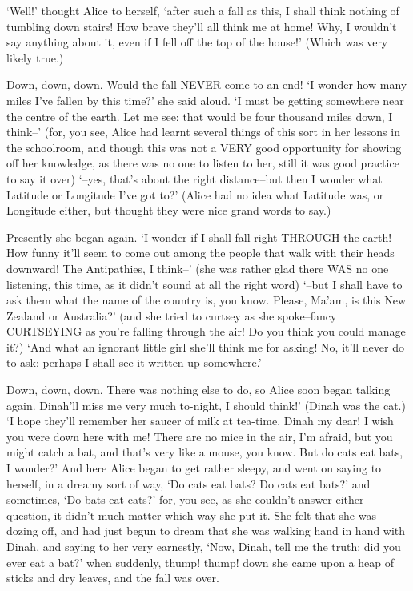 \documentclass{article}
\begin{document}
`Well!' thought Alice to herself, `after such a fall as this, I shall think nothing of tumbling down stairs! How brave they'll all think me at home! Why, I wouldn't say anything about it, even if I fell off the top of the house!' (Which was very likely true.)

Down, down, down. Would the fall NEVER come to an end! `I wonder how many miles I've fallen by this time?' she said aloud. `I must be getting somewhere near the centre of the earth. Let me see: that would be four thousand miles down, I think--' (for, you see, Alice had learnt several things of this sort in her lessons in the schoolroom, and though this was not a VERY good opportunity for showing off her knowledge, as there was no one to listen to her, still it was good practice to say it over) `--yes, that's about the right distance--but then I wonder what Latitude or Longitude I've got to?' (Alice had no idea what Latitude was, or Longitude either, but thought they were nice grand words to say.)

Presently she began again. `I wonder if I shall fall right THROUGH the earth! How funny it'll seem to come out among the people that walk with their heads downward! The Antipathies, I think--' (she was rather glad there WAS no one listening, this time, as it didn't sound at all the right word) `--but I shall have to ask them what the name of the country is, you know. Please, Ma'am, is this New Zealand or Australia?' (and she tried to curtsey as she spoke--fancy CURTSEYING as you're falling through the air! Do you think you could manage it?) `And what an ignorant little girl she'll think me for asking! No, it'll never do to ask: perhaps I shall see it written up somewhere.'

Down, down, down. There was nothing else to do, so Alice soon began talking again. Dinah'll miss me very much to-night, I should think!' (Dinah was the cat.) `I hope they'll remember her saucer of milk at tea-time. Dinah my dear! I wish you were down here with me! There are no mice in the air, I'm afraid, but you might catch a bat, and that's very like a mouse, you know. But do cats eat bats, I wonder?' And here Alice began to get rather sleepy, and went on saying to herself, in a dreamy sort of way, `Do cats eat bats? Do cats eat bats?' and sometimes, `Do bats eat cats?' for, you see, as she couldn't answer either question, it didn't much matter which way she put it. She felt that she was dozing off, and had just begun to dream that she was walking hand in hand with Dinah, and saying to her very earnestly, `Now, Dinah, tell me the truth: did you ever eat a bat?' when suddenly, thump! thump! down she came upon a heap of sticks and dry leaves, and the fall was over.
\end{document}
